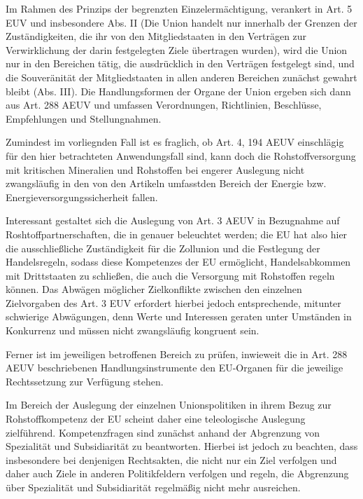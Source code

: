 \documentclass[12pt,a4paper,oneside]{book} %
\begin{document}
	Im Rahmen des Prinzips der begrenzten Einzelermächtigung, verankert in Art. 5 EUV und insbesondere Abs. II (Die Union handelt nur innerhalb der Grenzen der Zuständigkeiten, die ihr von den Mitgliedstaaten in den Verträgen zur Verwirklichung der darin festgelegten Ziele übertragen wurden), wird die Union nur in den Bereichen tätig, die ausdrücklich in den Verträgen festgelegt sind, und  die Souveränität der Mitgliedstaaten in allen anderen Bereichen zunächst gewahrt bleibt (Abs. III).
	 Die Handlungsformen der Organe der Union ergeben sich dann aus Art. 288 AEUV und umfassen Verordnungen, Richtlinien, Beschlüsse, Empfehlungen und Stellungnahmen.
	
	Zumindest im vorliegnden Fall ist es fraglich, ob Art. 4, 194 AEUV einschlägig für den hier betrachteten Anwendungsfall sind, kann doch die Rohstoffversorgung mit kritischen Mineralien und Rohstoffen bei engerer Auslegung nicht zwangsläufig in den von den Artikeln umfasstden Bereich der Energie bzw. Energieversorgungssicherheit fallen.
	
	Interessant gestaltet sich die Auslegung von Art. 3 AEUV in Bezugnahme auf Roshtoffpartnerschaften, die in %
	genauer beleuchtet werden; die EU hat also hier die ausschließliche Zuständigkeit für die Zollunion und die Festlegung der Handelsregeln, sodass diese Kompetenzes der EU ermöglicht, Handelsabkommen mit Drittstaaten zu schließen, die auch die Versorgung mit Rohstoffen regeln können. Das Abwägen möglicher Zielkonflikte zwischen den einzelnen Zielvorgaben des Art. 3 EUV erfordert hierbei jedoch entsprechende, mitunter schwierige Abwägungen, denn Werte und Interessen geraten unter Umständen in Konkurrenz und müssen nicht zwangsläufig kongruent sein.\autocite{Müller-Ibold/Herrmann, EuZW 2022, 1029, 1030} 
	
	Ferner ist im jeweiligen betroffenen Bereich zu prüfen, inwieweit die in Art. 288 AEUV beschriebenen Handlungsinstrumente den EU-Organen für die jeweilige Rechtssetzung zur Verfügung stehen.  
	
	Im Bereich der Auslegung der einzelnen Unionspolitiken in ihrem Bezug zur Rohstoffkompetenz der EU scheint daher eine teleologische Auslegung zielführend. Kompetenzfragen sind zunächst anhand der Abgrenzung von Spezialität und Subsidiarität zu beantworten.\autocite{Callies, Berliner Beiträge 137, S. 39f.} Hierbei ist jedoch zu beachten, dass insbesondere bei denjenigen Rechtsakten, die nicht nur ein Ziel verfolgen und daher auch Ziele in anderen Politikfeldern verfolgen und regeln, die Abgrenzung über Spezialität und Subsidiarität regelmäßig nicht mehr ausreichen.\autocite{CITATIONNEEDED}
	
\end{document}
